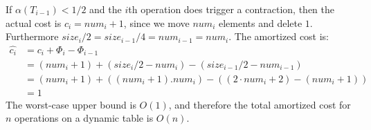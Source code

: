 If $\alpha(T_{i-1})<1/2$ and the $i$th operation does trigger a contraction,
then the actual cost is $c_i=num_i+1$, since we move $num_i$ elements and delete
$1$. Furthermore $size_i/2=size_{i-1}/4=num_{i-1}=num_i$. The amortized cost is:
\begin{align*}
  \hat{c_i}&=c_i+\Phi_i-\Phi_{i-1}\\
  &=(num_i+1)+(size_i/2-num_i)-(size_{i-1}/2-num_{i-1})\\
  &=(num_i+1)+((num_i+1).num_i)-((2\cdot num_i+2)-(num_i+1))\\
  &=1
\end{align*}
The worst-case upper bound is $O(1)$, and therefore the total amortized cost for
$n$ operations on a dynamic table is $O(n)$.
